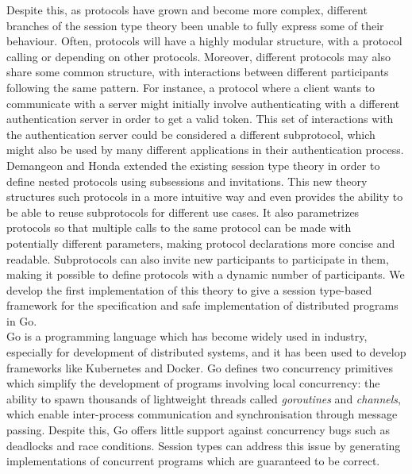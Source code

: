 \documentclass[12pt,twoside]{report}
\begin{document}
Despite this, as protocols have grown and become more complex, different branches of the session type theory been unable to fully express some of their behaviour. Often, protocols will have a highly modular structure, with a protocol calling or depending on other protocols. Moreover, different protocols may also share some common structure, with interactions between different participants following the same pattern. For instance, a protocol where a client wants to communicate with a server might initially involve authenticating with a different authentication server in order to get a valid token. This set of interactions with the authentication server could be considered a different subprotocol, which might also be used by many different applications in their authentication process. \\

Demangeon and Honda \cite{nestedprotocols} extended the existing session type theory in order to define nested protocols using subsessions and invitations. This new theory structures such protocols in a more intuitive way and even provides the ability to be able to reuse subprotocols for different use cases. It also parametrizes protocols so that multiple calls to the same protocol can be made with potentially different parameters, making protocol declarations more concise and readable. Subprotocols can also invite new participants to participate in them, making it possible to define protocols with a dynamic number of participants. We develop the first implementation of this theory to give a session type-based framework for the specification and safe implementation of distributed programs in Go.\\

Go is a programming language which has become widely used in industry\cite{gousers}, especially for development of distributed systems, and it has been used to develop frameworks like Kubernetes and Docker. Go defines two concurrency primitives which simplify the development of programs involving local concurrency\cite{godocs}: the ability to spawn thousands of lightweight threads called \textit{goroutines} and \textit{channels}, which enable inter-process communication and synchronisation through message passing. Despite this, Go offers little support against concurrency bugs such as deadlocks and race conditions. Session types can address this issue by generating implementations of concurrent programs which are guaranteed to be correct.\\
\end{document}
